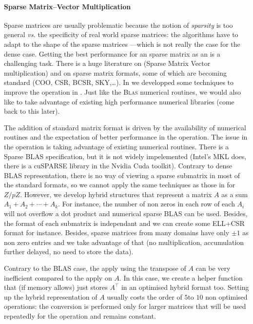 \paragraph{Sparse Matrix--Vector Multiplication} 
%
Sparse matrices are usually problematic because the notion of \emph{sparsity}
is too general \emph{vs.} the specificity of real world sparse matrices: the
algorithms have to adapt to the shape of the sparse matrices ---which is not really the case
for the dense case.
%
Getting the best performance for an sparse matrix as an \applin is a
challenging task. There is a huge literature on \spmv (Sparse Matrix Vector
multiplication) and on sparse matrix formats, some of which are becoming
standard (COO, CSR, BCSR, SKY,\ldots).  In \cite{Boyer:2010:spmv} we developped
some techniques to improve the \spmv operation in \linbox.
Just like the \textsc{Blas} numerical
routines, we would also like to take advantage of existing high performance
numerical libraries (come back to this later).
%
\par
%
The addition of standard matrix format is driven by the availability of
numerical routines and the expectation of better performance in the \spmv
operation.
The issue in the \spmv operation is taking advantage of existing numerical
routines. There is a Sparse BLAS specification, but it is not widely
impelemented (Intel's MKL does, there is a cuSPARSE library in the Nvidia Cuda
toolkit). Contrary to dense BLAS representation, there is no way of viewing a
sparse submatrix in most of the standard formats, so we cannot apply the same
techniques as those in \fflas for $Z/pZ$. However, we develop hybrid structures
that represent a matrix $A$ as a sum $A_1 + A_2 + \cdots + A_k$. For instance,
the number of non zeros in each row of each $A_i$ will not overflow a dot
product and numerical sparse BLAS can be used. Besides, the format of each
submatrix is independant and we can create some ELL+CSR format for instance.
Besides, sparse matrices  from many domains have only $\pm1$ as non zero
entries and we take advantage of that (no multiplication, accumulation further
delayed, no need to store the data).
%
\par
%
Contrary to the BLAS case, the apply using the transpose of $A$ can be very
inefficient compared to the apply on $A$. In this case, we create a helper
function that (if memory allows) just stores $A^\top$ in an optimised hybrid
format too. Setting up the hybrid representation of $A$ usually costs the order
of $5$to $10$ non optimised \spmv operations: the conversion is performed only
for larger matrices that will be used repeatedly for the \spmv operation and
remains constant.
